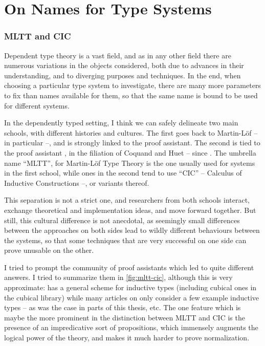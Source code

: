 \chapter{On Names for Type Systems}
\label{chap:names}

\subsection*{MLTT and CIC}

Dependent type theory is a vast field, and as in any other field there are numerous
variations in the objects considered, both due to advances in their understanding,
and to diverging purposes and techniques. In the end, when 
choosing a particular type system to investigate, there are many more parameters to 
fix than names available for them, so that the same name is bound to be used for
different systems.

In the dependently typed setting, I think we can safely delineate two main schools,
with different histories and cultures. The first goes back to Martin-Löf –
in particular  –, and is strongly linked to the 
proof assistant. The second is tied to the proof assistant , in the filiation of
Coquand and Huet – since .
The umbrella name “MLTT”, for Martin-Löf Type Theory is the one usually used for systems
in the first school, while ones in the second tend to use “CIC” – Calculus of Inductive
Constructions –, or variants thereof.

This separation is not a strict one, and researchers from both schools interact, exchange
theoretical and implementation ideas, and move forward together. But still, this cultural
difference is not anecdotal, as seemingly small differences between the approaches on both
sides lead to wildly different behaviours between the systems, so that  some techniques
that are very successful on one side can prove unusable on the other.

I tried to prompt the community of proof assistants%
which led to quite different answers. I tried to summarize them in \cref{fig:mltt-cic},
although this is very approximate:  has a general scheme for inductive types
(including cubical ones in the cubical library) while many articles on  only
consider a few example inductive types – as was the case in parts of this thesis, etc.
The one feature which is maybe the more prominent in the distinction between MLTT and
CIC is the presence of an impredicative sort of propositions, which immensely augments the
logical power of the theory, and makes it much harder to prove normalization.

